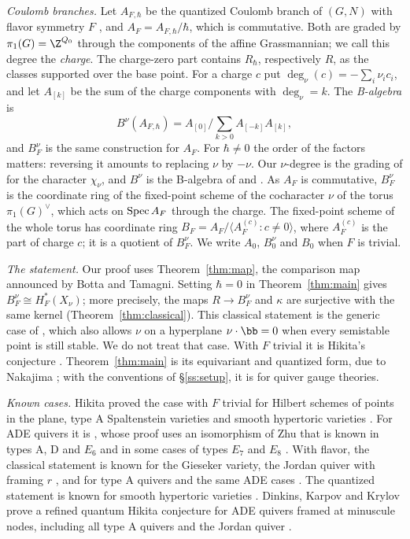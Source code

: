 \documentclass[11pt]{amsart}
\begin{document}
\emph{Coulomb branches.}  Let $A_{F,\hbar}$ be the quantized Coulomb branch
of $(G,N)$ with flavor symmetry $F$ \cite{BFN}, and $A_F=A_{F,\hbar}/\hbar$,
which is commutative.  Both are graded by $\pi_1(G)=\Z^{Q_0}$ through the
components of the affine Grassmannian; we call this degree the
\emph{charge}.  The charge-zero part contains $R_\hbar$, respectively $R$,
as the classes supported over the base point.  For a charge $c$ put
$\deg_\nu(c)=-\sum_i\nu_ic_i$, and let $A_{[k]}$ be the sum of the charge
components with $\deg_\nu=k$.  The \emph{B-algebra} is
\[
 B^\nu(A_{F,\hbar})=A_{[0]}\Big/\textstyle\sum_{k>0}A_{[-k]}A_{[k]},
\]
and $B^\nu_F$ is the same construction for $A_F$.  For $\hbar\neq0$ the
order of the factors matters: reversing it amounts to replacing $\nu$ by
$-\nu$.  Our $\nu$-degree is the grading of \cite[\S5.1.6]{hilburnBFNSpringer2023} for the
character $\chi_\nu$, and $B^\nu$ is the B-algebra of \cite[\S5.7]{hilburnBFNSpringer2023}
and \cite[\S3.5]{KTWWY}.  As $A_F$ is
commutative, $B^\nu_F$ is the
coordinate ring of the fixed-point scheme of the cocharacter $\nu$ of the
torus $\pi_1(G)^\vee$, which acts on $\operatorname{Spec} A_F$ through the charge.  The
fixed-point scheme of the whole torus has coordinate ring
$B_F=A_F/\langle A_F^{(c)}:c\neq0\rangle$, where $A_F^{(c)}$ is the part of
charge $c$; it is a quotient of $B^\nu_F$.  We write $A_0$, $B^\nu_0$ and $B_0$
when $F$ is trivial.


\emph{The statement.}  Our proof uses Theorem~\ref{thm:map}, the
comparison map announced by Botta and Tamagni.  Setting $\hbar=0$ in
Theorem~\ref{thm:main} gives $B^\nu_F\cong H^*_F(X_\nu)$; more precisely, the
maps $R\to B^\nu_F$ and $\kappa$ are surjective with the same kernel
(Theorem~\ref{thm:classical}).  This classical statement is the generic case
of , which also allows $\nu$ on a hyperplane $\nu\cdot\bb=0$
when every semistable point is still stable.  We do not treat that case.
With $F$ trivial it is Hikita's conjecture
\cite{hikitaAlgebroGeometricRealization2016}.  Theorem~\ref{thm:main} is its
equivariant and quantized form, due to Nakajima \cite[Conj.~8.9]{KTWWY}; with
the conventions of \S\ref{ss:setup}, it is
\cite[Conj.~5.26]{hilburnBFNSpringer2023} for quiver gauge theories.

\emph{Known cases.}  Hikita proved the case with $F$ trivial for Hilbert
schemes of points in the plane, type A Spaltenstein varieties and smooth
hypertoric varieties \cite{hikitaAlgebroGeometricRealization2016}.  For ADE quivers it is
\cite[Thm.~8.1]{KTWWY}, whose proof uses an isomorphism of Zhu that is
known in types A, D and $E_6$ and in some cases of types $E_7$ and $E_8$
\cite[Rem.~2.18, Cor.~2.17]{dumanskiKtheoreticHikita2025}.  With flavor, the classical statement is known for the
Gieseker variety, the Jordan quiver with framing $r$
\cite[Thm.~1.14]{krylovHikitaNakajimaConjecture2025}, and for type A quivers and the same ADE
cases \cite[Cors.~2.15, 2.17]{dumanskiKtheoreticHikita2025}.  The quantized statement is known for
smooth hypertoric varieties \cite[Thm.~1.2, Rem.~5.3]{kamnitzerQuantumHikita2021}.  Dinkins, Karpov
and Krylov prove a refined quantum Hikita conjecture for ADE quivers framed at
minuscule nodes, including all type A quivers and the Jordan quiver
\cite[Thm.~B]{dinkinsQuantumHikita2026}.
\end{document}

